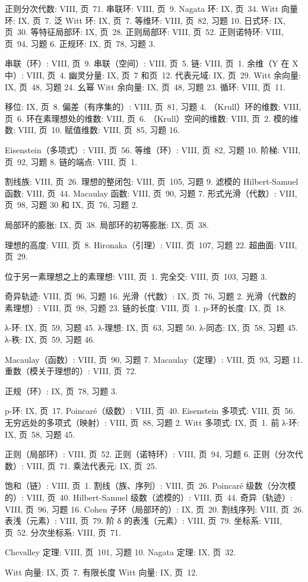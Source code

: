 
正则分次代数: VIII, 页~71. 串联环: VIII, 页~9. Nagata 环: IX, 页~34. Witt 向量环: IX, 页~7. 泛 Witt 环: IX, 页~7. 等维环: VIII, 页~82, 习题 10. 日式环: IX, 页~30. 等特征局部环: IX, 页~28. 正则局部环: VIII, 页~52. 正则诺特环: VIII, 页~94, 习题 6. 正规环: IX, 页~78, 习题 3.

串联（环）: VIII, 页~9. 串联（空间）: VIII, 页~5. 链: VIII, 页~1. 余维（Y 在 X 中）: VIII, 页~4. 幽灵分量: IX, 页~7 和页~12. 代表元域: IX, 页~29. Witt 余向量: IX, 页~48, 习题 24. 幺幂 Witt 余向量: IX, 页~48, 习题 23. 循环: VIII, 页~11.

移位: IX, 页~8. 偏差（有序集的）: VIII, 页~81, 习题 4. （Krull）环的维数: VIII, 页~6. 环在素理想处的维数: VIII, 页~6. （Krull）空间的维数: VIII, 页~2. 模的维数: VIII, 页~10. 赋值维数: VIII, 页~85, 习题 16.

Eisenstein（多项式）: VIII, 页~56. 等维（环）: VIII, 页~82, 习题 10. 阶梯: VIII, 页~92, 习题 8. 链的端点: VIII, 页~1.

割线族: VIII, 页~26. 理想的整闭包: VIII, 页~105, 习题 9. 滤模的 Hilbert-Samuel 函数: VIII, 页~44. Macaulay 函数: VIII, 页~90, 习题 7. 形式光滑（代数）: VIII, 页~98, 习题 30 和 IX, 页~76, 习题 2.

局部环的膨胀: IX, 页~38. 局部环的初等膨胀: IX, 页~38.

理想的高度: VIII, 页~8. Hironaka（引理）: VIII, 页~107, 习题 22. 超曲面: VIII, 页~29.

位于另一素理想之上的素理想: VIII, 页~1. 完全交: VIII, 页~103, 习题 3.

奇异轨迹: VIII, 页~96, 习题 16. 光滑（代数）: IX, 页~76, 习题 2. 光滑（代数的素理想）: VIII, 页~98, 习题 23. 链的长度: VIII, 页~1. p-环的长度: IX, 页~18.

λ-环: IX, 页~59, 习题 45. λ-理想: IX, 页~63, 习题 50. λ-同态: IX, 页~58, 习题 45. λ-秩: IX, 页~59, 习题 46.

Macaulay（函数）: VIII, 页~90, 习题 7. Macaulay（定理）: VIII, 页~93, 习题 11. 重数（模关于理想的）: VIII, 页~72.

正规（环）: IX, 页~78, 习题 3.

p-环: IX, 页~17. Poincaré（级数）: VIII, 页~40. Eisenstein 多项式: VIII, 页~56. 无穷远处的多项式（映射）: VIII, 页~88, 习题 2. Witt 多项式: IX, 页~1. 前 λ-环: IX, 页~58, 习题 45.

正则（局部环）: VIII, 页~52. 正则（诺特环）: VIII, 页~94, 习题 6. 正则（分次代数）: VIII, 页~71. 乘法代表元: IX, 页~25.

饱和（链）: VIII, 页~1. 割线（族、序列）: VIII, 页~26. Poincaré 级数（分次模的）: VIII, 页~40. Hilbert-Samuel 级数（滤模的）: VIII, 页~44. 奇异（轨迹）: VIII, 页~96, 习题 16. Cohen 子环（局部环的）: IX, 页~20. 割线序列: VIII, 页~26. 表浅（元素）: VIII, 页~79. 阶 δ 的表浅（元素）: VIII, 页~79. 坐标系: VIII, 页~52. 分次坐标系: VIII, 页~71.

Chevalley 定理: VIII, 页~101, 习题 10. Nagata 定理: IX, 页~32.

Witt 向量: IX, 页~7. 有限长度 Witt 向量: IX, 页~12.

